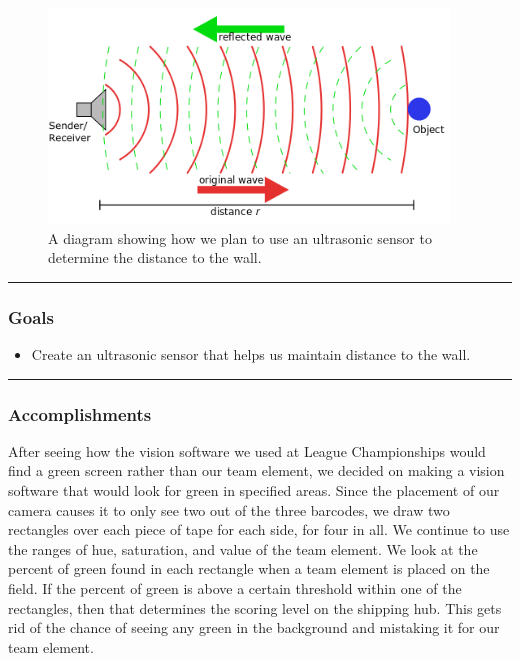 \begin{figure}[htp]
\centering
\includegraphics[width=0.95\textwidth, angle=0]{Meetings/February/02-08-22/02-08-22 3.PNG}
\caption{A diagram showing how we plan to use an ultrasonic sensor to determine the distance to the wall.}
\label{fig:020822_3}
\end{figure}



\noindent\hfil\rule{\textwidth}{.4pt}\hfil
\subsubsection*{Goals}
\begin{itemize}
    \item Create an ultrasonic sensor that helps us maintain distance to the wall. 

\end{itemize} 

\noindent\hfil\rule{\textwidth}{.4pt}\hfil

\subsubsection*{Accomplishments}
After seeing how the vision software we used at League Championships would find a green screen rather than our team element, we decided on making a vision software that would look for green in specified areas. Since the placement of our camera causes it to only see two out of the three barcodes, we draw two rectangles over each piece of tape for each side, for four in all. We continue to use the ranges of hue, saturation, and value of the team element. We look at the percent of green found in each rectangle when a team element is placed on the field. If the percent of green is above a certain threshold within one of the rectangles, then that determines the scoring level on the shipping hub. This gets rid of the chance of seeing any green in the background and mistaking it for our team element.


